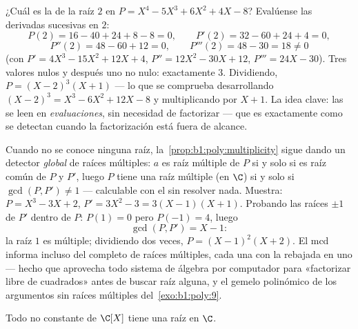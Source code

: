 \begin{example}\label{ex:b1:poly:multexample}
¿Cuál es la  de la raíz $2$ en
$P = X^4 - 5X^3 + 6X^2 + 4X - 8$? Evalúense las derivadas sucesivas en $2$:
\[
P(2) = 16 - 40 + 24 + 8 - 8 = 0, \qquad
P'(2) = 32 - 60 + 24 + 4 = 0,
\]
\[
P''(2) = 48 - 60 + 12 = 0, \qquad
P'''(2) = 48 - 30 = 18 \neq 0
\]
(con $P' = 4X^3 - 15X^2 + 12X + 4$, $P'' = 12X^2 - 30X + 12$,
$P''' = 24X - 30$). Tres valores nulos y después uno no nulo:
 exactamente $3$. Dividiendo, $P = (X - 2)^3(X + 1)$ ---
lo que se comprueba desarrollando $(X-2)^3 = X^3 - 6X^2 + 12X - 8$ y
multiplicando por $X + 1$. La idea clave: las  se leen
en \emph{evaluaciones}, sin necesidad de factorizar --- que es
exactamente como se detectan cuando la factorización está fuera de
alcance.
\end{example}

\begin{example}\label{ex:b1:poly:gcdmultiple}
Cuando no se conoce ninguna raíz, la~\cref{prop:b1:poly:multiplicity}
sigue dando un detector \emph{global} de raíces múltiples: $a$ es raíz
múltiple de $P$ si y solo si es raíz común de $P$ y $P'$, luego $P$
tiene una raíz múltiple (en $\C$) si y solo si $\gcd(P, P') \neq 1$ ---
calculable con el  sin resolver nada. Muestra:
$P = X^3 - 3X + 2$, $P' = 3X^2 - 3 = 3(X - 1)(X + 1)$. Probando las
raíces $\pm1$ de $P'$ dentro de $P$: $P(1) = 0$ pero $P(-1) = 4$, luego
\[
\gcd(P, P') = X - 1 :
\]
la raíz $1$ es múltiple; dividiendo dos veces, $P = (X - 1)^2(X + 2)$.
El mcd informa incluso del  completo de raíces múltiples, cada
una con la  rebajada en uno --- hecho que aprovecha todo
sistema de álgebra por computador para «factorizar libre de cuadrados»
antes de buscar raíz alguna, y el gemelo polinómico de los argumentos
sin raíces múltiples del~\cref{exo:b1:poly:9}.
\end{example}

\begin{theorem}\label{thm:b1:poly:fta}
Todo  no constante de $\C[X]$ tiene una raíz en
$\C$.
\end{theorem}
\admitted

